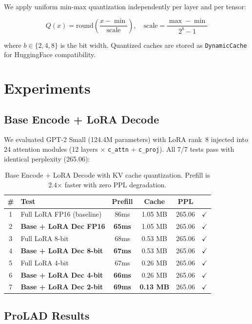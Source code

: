 \documentclass[11pt]{article}
\begin{document}
We apply uniform min-max quantization independently per layer and per tensor:

\[
Q(x) = \text{round}\left(\frac{x - \min}{\text{scale}}\right), \quad \text{scale} = \frac{\max - \min}{2^b - 1}
\]

where $b \in \{2, 4, 8\}$ is the bit width. Quantized caches are stored as \texttt{DynamicCache} for HuggingFace compatibility.

\section{Experiments}
\label{sec:experiments}

\subsection{Base Encode + LoRA Decode}
\label{sec:be-ld-results}

We evaluated GPT-2 Small (124.4M parameters) with LoRA rank~8 injected into 24 attention modules (12 layers $\times$ \texttt{c\_attn} + \texttt{c\_proj}). All 7/7 tests pass with identical perplexity (265.06):

\begin{table}[H]
\centering
\caption{Base Encode + LoRA Decode with KV cache quantization. Prefill is 2.4$\times$ faster with zero PPL degradation.}
\label{tab:be-ld}
\begin{tabular}{clcccc}
\toprule
\# & Test & Prefill & Cache & PPL & \\
\midrule
1 & Full LoRA FP16 (baseline) & 86ms & 1.05 MB & 265.06 & $\checkmark$ \\
2 & \textbf{Base + LoRA Dec FP16} & \textbf{65ms} & 1.05 MB & 265.06 & $\checkmark$ \\
3 & Full LoRA 8-bit & 68ms & 0.53 MB & 265.06 & $\checkmark$ \\
4 & \textbf{Base + LoRA Dec 8-bit} & \textbf{67ms} & 0.53 MB & 265.06 & $\checkmark$ \\
5 & Full LoRA 4-bit & 67ms & 0.26 MB & 265.06 & $\checkmark$ \\
6 & \textbf{Base + LoRA Dec 4-bit} & \textbf{66ms} & 0.26 MB & 265.06 & $\checkmark$ \\
7 & \textbf{Base + LoRA Dec 2-bit} & \textbf{69ms} & \textbf{0.13 MB} & 265.06 & $\checkmark$ \\
\bottomrule
\end{tabular}
\end{table}

\subsection{ProLAD Results}
\label{sec:prolad-results}
\end{document}
